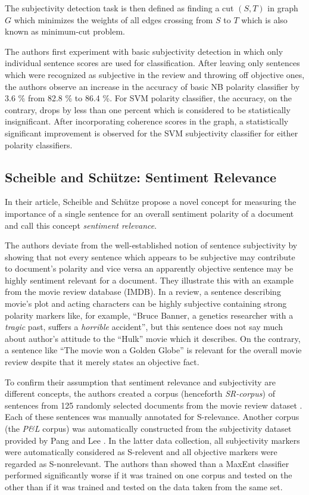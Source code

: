 \documentclass[a4paper,11pt]{article}
\begin{document}
The subjectivity detection task is then defined as finding a cut
$(S,T)$ in graph $G$ which minimizes the weights of all edges crossing
from $S$ to $T$ which is also known as minimum-cut problem.

The authors first experiment with basic subjectivity detection in
which only individual sentence scores are used for classification.
After leaving only sentences which were recognized as subjective in
the review and throwing off objective ones, the authors observe an
increase in the accuracy of basic NB polarity classifier by 3.6 \%
from 82.8 \% to 86.4 \%.  For SVM polarity classifier, the accuracy,
on the contrary, drops by less than one percent which is considered to
be statistically insignificant.  After incorporating coherence scores
in the graph, a statistically significant improvement is observed for
the SVM subjectivity classifier for either polarity classifiers.

\subsection{Scheible and Sch\"utze: Sentiment Relevance\cite{Scheible-13}}

In their article, Scheible and Sch\"utze propose a novel concept for
measuring the importance of a single sentence for an overall sentiment
polarity of a document and call this concept \textit{sentiment
  relevance}.

The authors deviate from the well-established notion of sentence
subjectivity by showing that not every sentence which appears to be
subjective may contribute to document's polarity and vice versa an
apparently objective sentence may be highly sentiment relevant for a
document.  They illustrate this with an example from the movie review
database (IMDB).  In a review, a sentence describing movie's plot and
acting characters can be highly subjective containing strong polarity
markers like, for example, ``Bruce Banner, a genetics researcher with
a \textit{tragic} past, suffers a \textit{horrible} accident'', but
this sentence does not say much about author's attitude to the
``Hulk'' movie which it describes.  On the contrary, a sentence like
``The movie won a Golden Globe'' is relevant for the overall movie
review despite that it merely states an objective fact.

To confirm their assumption that sentiment relevance and subjectivity
are different concepts, the authors created a corpus (henceforth
\textit{SR-corpus}) of sentences from 125 randomly selected documents
from the movie review dataset \cite{Pang-Lee-02}.  Each of these
sentences was manually annotated for S-relevance.  Another corpus (the
\textit{P\&L} corpus) was automatically constructed from the
subjectivity dataset provided by Pang and Lee \cite{Pang-Lee-04}.  In
the latter data collection, all subjectivity markers were
automatically considered as S-relevent and all objective markers were
regarded as S-nonrelevant.  The authors than showed than a MaxEnt
classifier performed significantly worse if it was trained on one
corpus and tested on the other than if it was trained and tested on
the data taken from the same set.
\end{document}
